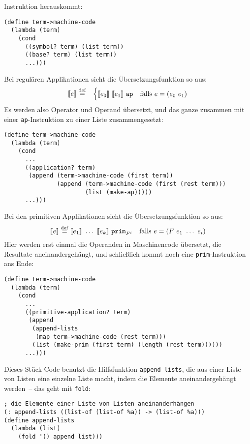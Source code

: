 Instruktion herauskommt:
%
\begin{lstlisting}
(define term->machine-code
  (lambda (term)
    (cond
      ((symbol? term) (list term))
      ((base? term) (list term))
      ...)))
\end{lstlisting}
%
Bei regulären Applikationen sieht die Übersetzungsfunktion so aus:
%
\begin{eqnarray*}
  \llbracket e \rrbracket &\stackrel{\rm def}{=}&
  \begin{cases}
    \llbracket e_0\rrbracket~\llbracket e_1\rrbracket~\mathtt{ap}
    & \textrm{falls $e = (e_0~e_1)$}\\
  \end{cases}
\end{eqnarray*}
%
Es werden also Operator und Operand übersetzt, und das ganze zusammen
mit einer \lstinline{ap}-Instruktion zu einer Liste zusammengesetzt:
%
\begin{lstlisting}
(define term->machine-code
  (lambda (term)
    (cond
      ...
      ((application? term)
       (append (term->machine-code (first term))
               (append (term->machine-code (first (rest term)))
                       (list (make-ap)))))
      ...)))
\end{lstlisting}
%
Bei den primitiven Applikationen sieht die Übersetzungsfunktion so
aus:
%
\begin{displaymath}
  \llbracket e \rrbracket \stackrel{\rm def}{=}
    \llbracket e_1\rrbracket~\ldots~\llbracket e_k\rrbracket~\mathtt{prim}_{F^i}
     \quad\textrm{falls $e = (F~e_1~\ldots~e_i)$}
\end{displaymath}
%
Hier werden erst einmal die Operanden in Maschinencode übersetzt, die
Resultate aneinandergehängt, und schließlich kommt noch eine
\lstinline{prim}-Instruktion ans Ende:
%
\begin{lstlisting}
(define term->machine-code
  (lambda (term)
    (cond
      ...
      ((primitive-application? term)
       (append
        (append-lists
         (map term->machine-code (rest term)))
        (list (make-prim (first term) (length (rest term))))))
      ...)))
\end{lstlisting}
%
Dieses Stück Code benutzt die Hilfsfunktion \lstinline{append-lists}, die
aus einer Liste von Listen eine einzelne Liste macht, indem die
Elemente aneinandergehängt werden~-- das geht mit \lstinline{fold}:
%
\begin{lstlisting}
; die Elemente einer Liste von Listen aneinanderhängen
(: append-lists ((list-of (list-of %a)) -> (list-of %a)))
(define append-lists
  (lambda (list)
    (fold '() append list)))
\end{lstlisting}
